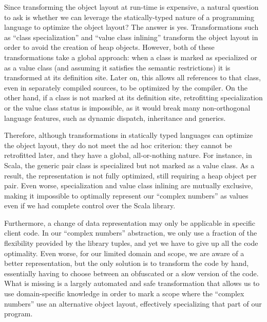 
Since transforming the object layout at run-time is expensive, a
natural question to ask is whether we can leverage the
statically-typed nature of a programming language to optimize the
object layout? The answer is yes. Transformations such as ``class
specialization'' and ``value class inlining'' transform the object
layout in order to avoid the creation of heap objects. However, both
of these transformations take a global approach: when a class is
marked as specialized or as a value class (and assuming it satisfies the
semantic restrictions) it is transformed at its definition site. Later
on, this allows all references to that class, even in separately
compiled sources, to be optimized by the compiler. On the other hand,
if a class is not marked at its definition site, retrofitting
specialization or the value class status is impossible, as it would
break many non-orthogonal language features, such as dynamic dispatch,
inheritance and generics.

Therefore, although transformations in statically typed languages can
optimize the object layout, they do not meet the ad hoc criterion:
they cannot be retrofitted later, and they have a global, all-or-nothing
nature. For instance, in Scala, the generic pair class is specialized
but not marked as a value class. As a result, the representation is
not fully optimized, still requiring a heap object per pair. Even
worse, specialization and value class inlining are mutually exclusive,
making it impossible to optimally represent our ``complex numbers''
as values even if we had complete control over the Scala library.

Furthermore, a change of data representation may only be applicable in
specific client code. In our ``complex numbers'' abstraction, we only
use a fraction of the flexibility provided by the library tuples, and
yet we have to give up all the code optimality. Even worse, for our
limited domain and scope, we are aware of a better representation, but
the only solution is to transform the code by hand, essentially having
to choose between an obfuscated or a slow version of the code. What is
missing is a largely automated and safe transformation that allows us
to use domain-specific knowledge in order to mark a scope where the
``complex numbers'' use an alternative object layout, effectively
specializing that part of our program.

